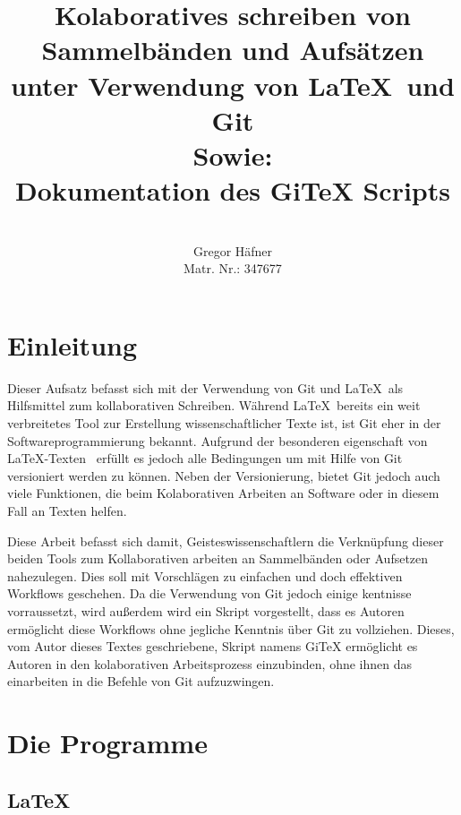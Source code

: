 \documentclass[12pt,a4paper]{scrartcl}
\author{\\ Gregor Häfner \\
{\small Matr. Nr.: 347677} }
\title{Kolaboratives schreiben von Sammelbänden und Aufsätzen unter Verwendung von \LaTeX ~und Git \bigskip \\ Sowie: \\ Dokumentation des GiTeX Scripts}
\begin{document}
\begin{titlepage}
 
\maketitle
\bigskip
\tableofcontents
\pagebreak
 
\end{titlepage}


\section{Einleitung}

Dieser Aufsatz befasst sich mit der Verwendung von Git und \LaTeX \ als Hilfsmittel zum kollaborativen Schreiben. Während \LaTeX \ bereits ein weit verbreitetes Tool zur Erstellung wissenschaftlicher Texte ist, ist Git eher in der Softwareprogrammierung bekannt. Aufgrund der besonderen eigenschaft von \LaTeX -Texten \ erfüllt es jedoch alle Bedingungen um mit Hilfe von Git versioniert werden zu können. Neben der Versionierung, bietet Git jedoch auch viele Funktionen, die beim Kolaborativen Arbeiten an Software oder in diesem Fall an Texten helfen.

 Diese Arbeit befasst sich damit, Geisteswissenschaftlern die Verknüpfung dieser beiden Tools zum Kollaborativen arbeiten an Sammelbänden oder Aufsetzen nahezulegen. Dies soll mit Vorschlägen zu einfachen und doch effektiven Workflows geschehen. Da die Verwendung von Git jedoch einige kentnisse vorraussetzt, wird außerdem wird ein Skript vorgestellt, dass es Autoren ermöglicht diese Workflows ohne jegliche Kenntnis über Git zu vollziehen. Dieses, vom Autor dieses Textes geschriebene, Skript namens GiTeX ermöglicht es Autoren in den kolaborativen Arbeitsprozess einzubinden, ohne ihnen das einarbeiten in die Befehle von Git aufzuzwingen.

\section{Die Programme}

\subsection{\LaTeX}
\end{document}
